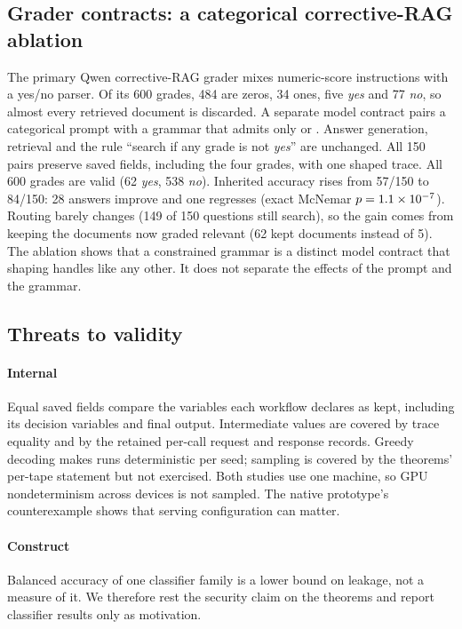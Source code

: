 \subsection{Grader contracts: a categorical corrective-RAG ablation}\label{sec:crag}

The primary Qwen corrective-RAG grader mixes numeric-score instructions with a
yes/no parser. Of its 600 grades, 484 are zeros, 34 ones, five \emph{yes} and 77
\emph{no}, so almost every retrieved document is discarded. A separate model
contract pairs a categorical prompt with a grammar that admits only
 or . Answer generation, retrieval and
the rule ``search if any grade is not \emph{yes}'' are unchanged. All 150 pairs
preserve saved fields, including the four grades, with one shaped trace. All 600
grades are valid (62 \emph{yes}, 538 \emph{no}). Inherited accuracy rises from
57/150 to 84/150: 28 answers improve and one regresses (exact McNemar
$p=1.1\times10^{-7}$). Routing barely changes (149 of 150 questions still search),
so the gain comes from keeping the documents now graded relevant (62 kept
documents instead of 5). The ablation shows that a constrained grammar is a
distinct model contract that shaping handles like any other. It does not
separate the effects of the prompt and the grammar.

\subsection{Threats to validity}\label{sec:threats}

\paragraph{Internal}
Equal saved fields compare the variables each workflow declares as kept,
including its decision variables and final output. Intermediate values are covered
by trace equality and by the retained per-call request and response records.
Greedy decoding makes runs deterministic per seed; sampling is covered by the
theorems' per-tape statement but not exercised. Both studies use one machine, so
GPU nondeterminism across devices is not sampled. The native prototype's
counterexample shows that serving configuration can matter.

\paragraph{Construct}
Balanced accuracy of one classifier family is a lower bound on leakage, not a
measure of it. We therefore rest the security claim on the theorems and report
classifier results only as motivation.

